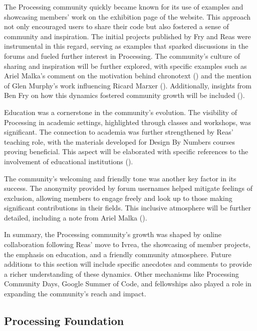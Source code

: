 The Processing community quickly became known for its use of examples and showcasing members' work on the exhibition page of the website. This approach not only encouraged users to share their code but also fostered a sense of community and inspiration. The initial projects published by Fry and Reas were instrumental in this regard, serving as examples that sparked discussions in the forums and fueled further interest in Processing. The community's culture of sharing and inspiration will be further explored, with specific examples such as Ariel Malka's comment on the motivation behind chronotext () and the mention of Glen Murphy's work influencing Ricard Marxer (). Additionally, insights from Ben Fry on how this dynamics fostered community growth will be included ().

Education was a cornerstone in the community's evolution. The visibility of Processing in academic settings, highlighted through classes and workshops, was significant. The connection to academia was further strengthened by Reas' teaching role, with the materials developed for Design By Numbers courses proving beneficial. This aspect will be elaborated with specific references to the involvement of educational institutions ().

The community's welcoming and friendly tone was another key factor in its success. The anonymity provided by forum usernames helped mitigate feelings of exclusion, allowing members to engage freely and look up to those making significant contributions in their fields. This inclusive atmosphere will be further detailed, including a note from Ariel Malka ().

In summary, the Processing community's growth was shaped by online collaboration following Reas' move to Ivrea, the showcasing of member projects, the emphasis on education, and a friendly community atmosphere. Future additions to this section will include specific anecdotes and comments to provide a richer understanding of these dynamics. Other mechanisms like Processing Community Days, Google Summer of Code, and fellowships also played a role in expanding the community's reach and impact.

\subsection{Processing Foundation}

